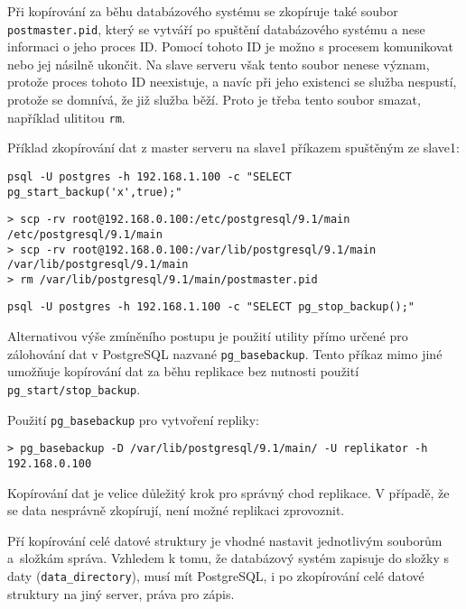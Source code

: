 Při kopírování za běhu databázového systému se zkopíruje také soubor \texttt{postmaster.pid}, který se vytváří po spuštění databázového systému a nese informaci o jeho proces ID. Pomocí tohoto ID je možno s procesem komunikovat nebo jej násilně ukončit. Na slave serveru však tento soubor nenese význam, protože proces tohoto ID neexistuje, a navíc při jeho existenci se služba nespustí, protože se domnívá, že již služba běží. Proto je třeba tento soubor smazat, například ulititou \texttt{rm}.

Příklad zkopírování dat z master serveru na slave1 příkazem spuštěným ze slave1:
\begin{lstlisting} 
psql -U postgres -h 192.168.1.100 -c "SELECT pg_start_backup('x',true);"
\end{lstlisting}
\begin{lstlisting}[keywordstyle=\bfseries\color{purpurova7},identifierstyle=\color{black},stringstyle=\color{black}]
> scp -rv root@192.168.0.100:/etc/postgresql/9.1/main /etc/postgresql/9.1/main
> scp -rv root@192.168.0.100:/var/lib/postgresql/9.1/main /var/lib/postgresql/9.1/main
> rm /var/lib/postgresql/9.1/main/postmaster.pid
\end{lstlisting}
\begin{lstlisting}
psql -U postgres -h 192.168.1.100 -c "SELECT pg_stop_backup();"
\end{lstlisting}

Alternativou výše zmíněního postupu je použití utility přímo určené pro zálohování dat v PostgreSQL nazvané \texttt{pg\_basebackup}. Tento příkaz mimo jiné umožňuje kopírování dat za běhu replikace bez nutnosti použití \texttt{pg\_start/stop\_backup}.

Použití \texttt{pg\_basebackup} pro vytvoření repliky:
\begin{lstlisting}[keywordstyle=\bfseries\color{purpurova7},identifierstyle=\color{black},stringstyle=\color{black}]
> pg_basebackup -D /var/lib/postgresql/9.1/main/ -U replikator -h 192.168.0.100
\end{lstlisting}

Kopírování dat je velice důležitý krok pro správný chod replikace. V případě, že se data nesprávně zkopírují, není možné replikaci zprovoznit. 

Pří kopírování celé datové struktury je vhodné nastavit jednotlivým souborům a~složkám správa. Vzhledem k tomu, že databázový systém zapisuje do složky s daty (\texttt{data\_directory}), musí mít PostgreSQL, i po zkopírování celé datové struktury na jiný server, práva pro zápis.

